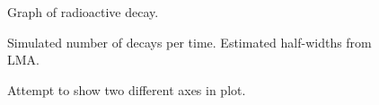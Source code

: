 \documentclass{article}
\begin{document}
\begin{figure}[H]
  \centering
  
  \caption{Graph of radioactive decay.}
\end{figure}

\begin{figure}[H]
  \centering
  
  \caption{Simulated number of decays per time.  Estimated half-widths from LMA.}
\end{figure}

\begin{figure}[H]
  \centering
  
  \caption{ Attempt to show two different axes in plot. }
\end{figure}
 
\end{document}
